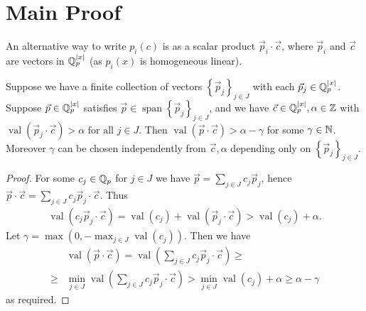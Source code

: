\documentclass{amsart}
\newcommand{\curly}[1]{\left\{#1\right\}}
\newcommand{\paren}[1]{\left(#1\right)}
\DeclareMathOperator{\vecspan}{span}
\DeclareMathOperator{\val}{val}
\begin{document}

\section{Main Proof}


An alternative way to write $p_i(c)$ is as a scalar product $\vec p_i \cdot \vec c$,
where $\vec p_i$ and $\vec c$ are vectors in $\mathbb{Q}_p^{|x|}$ (as $p_i(x)$ is homogeneous linear).

\begin{Lemma}	 
  Suppose we have a finite collection of vectors $\curly{\vec p_j}_{j \in J}$ with each $\vec p_j \in \mathbb{Q}_p^{|x|}$.
  Suppose $\vec p \in \mathbb{Q}_p^{|x|}$ satisfies $\vec p \in \vecspan \curly{\vec p_j}_{j \in J}$,
  and we have $\vec c \in \mathbb{Q}_p^{|x|}, \alpha \in \mathbb{Z}$ with $\val(\vec p_j \cdot \vec c) > \alpha \text{ for all } j \in J$.
  Then $\val(\vec p \cdot \vec c) > \alpha - \gamma$ for some $\gamma \in \mathbb{N}$.
  Moreover $\gamma$ can be chosen independently from $\vec c, \alpha$ depending only on $\curly{\vec p_j}_{j \in J}$.
\end{Lemma}

\begin{proof}
  For some $c_j \in \mathbb{Q}_p$ for $j \in J$ we have $\vec p = \sum_{j \in J} c_j \vec p_j$,
  hence $\vec p \cdot \vec c = \sum_{j \in J} c_j \vec p_j \cdot \vec c$.
  Thus
  \begin{align*}
    \val \paren{c_j \vec p_j \cdot \vec c} = \val \paren{c_j} + \val \paren{\vec p_j \cdot \vec c} > \val \paren{c_j} + \alpha.
  \end{align*}
  Let $\gamma = \max(0, -\max_{j \in J} \val \paren{c_j})$.
  Then we have 
  \begin{align*}
    &\val(\vec p \cdot \vec c) =
      \val \paren{\sum_{j \in J} c_j \vec p_j \cdot \vec c} \geq \\
      \geq &\min_{j \in J} \val\paren{\sum_{j \in J} c_j \vec p_j \cdot \vec c} >
      \min_{j \in J} \val(c_j) + \alpha \geq
      \alpha - \gamma
  \end{align*}
  as required.
\end{proof}
\end{document}
